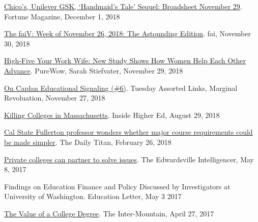 \documentclass[11pt,a4paper]{article}
\begin{document}
\begin{hangparas}{.25in}{1}

\href{http://fortune.com/2018/11/29/chicos-unilever-gsk-handmaids-tale-sequel-broadsheet-november-29/?xid=gn_editorspicks}{Chico's, Unilever GSK, `Handmaid's Tale' Sequel: Broadsheet November 29}. Fortune Magazine, December 1, 2018



\href{https://mailchi.mp/financialaccess/the-faiv-week-of-nov262018}{The faiV: Week of November 26, 2018: The Astounding Edition}. fai, November 30, 2018



\href{https://www.purewow.com/news/west-point-study-on-women-helping-each-other-at-work}{High-Five Your Work Wife: New Study Shows How Women Help Each Other Advance}. PureWow, Sarah Stiefvater, November 29, 2018



\href{https://marginalrevolution.com/marginalrevolution/2018/11/tuesday-assorted-links-191.html}{On Caplan Educational Signaling (\#6)}. Tuesday Assorted Links, Marginal Revoluation, November 27, 2018



\href{https://www.insidehighered.com/views/2018/08/29/state-policy-makers-should-stop-overlooking-role-private-colleges-providing-access}{Killing Colleges in Massachusetts}. Inside Higher Ed, August 29, 2018



\href{https://dailytitan.com/2018/02/cal-state-fullerton-professor-wonders-whether-major-course-requirements-made-simpler/}{Cal State Fullerton professor wonders whether major course requirements could be made simpler}. The Daily Titan, February 26, 2018



\href{http://www.theintelligencer.com/news/article/Private-colleges-can-partner-to-solve-issues-11129681.php}{Private colleges can partner to solve issues}. The Edwardsville Intelligencer, May 8, 2017



Findings on Education Finance and Policy Discussed by Investigators at University of Washington. Education Letter, May 3 2017



\href{http://www.theintermountain.com/opinion/columnists/2017/04/the-value-of-a-college-degree/}{The Value of a College Degree}. The Inter-Mountain, April 27, 2017




\end{hangparas}
\end{document}
